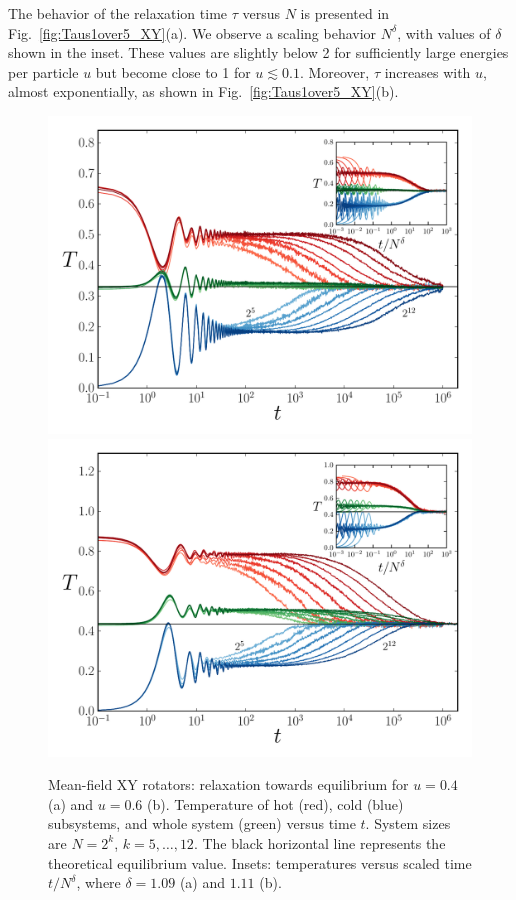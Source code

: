 \documentclass[aps,pre,showpacs,twocolumn,superscriptaddress,floatfix]{revtex4-1}
\begin{document}
 
The behavior of the relaxation time $\tau$ versus $N$ 
  is presented in Fig.~\ref{fig:Taus1over5_XY}(a). 
%
We observe a scaling behavior  $N^\delta$, with values of $\delta$ shown in the inset. 
These values are slightly below 2 for sufficiently large energies per particle $u$ but become close to 1 for 
 $u \lesssim 0.1$. 
%
Moreover, $\tau$ increases with $u$, almost exponentially, as shown in Fig.~\ref{fig:Taus1over5_XY}(b).


\begin{figure}[h!]
 \includegraphics[width=0.95\linewidth]{TempLogt_HMF__U_0.4__Delta_1.09.pdf}
 \includegraphics[width=0.95\linewidth]{TempLogt_HMF__U_0.6__Delta_1.11.pdf}
%
\caption{Mean-field XY rotators: relaxation towards equilibrium for $u=0.4$ (a) and $u=0.6$ (b). 
Temperature of hot (red), cold (blue) subsystems, and  whole system (green) versus  time $t$.  
System sizes are $N=2^k$, $k=5, \ldots, 12$. 
The black horizontal line represents the theoretical equilibrium value. 
Insets: temperatures versus  scaled time $t/N^\delta$, where $\delta=1.09$ (a) and $1.11$ (b). 
}
\label{fig:mf06}
\end{figure}
\end{document}
